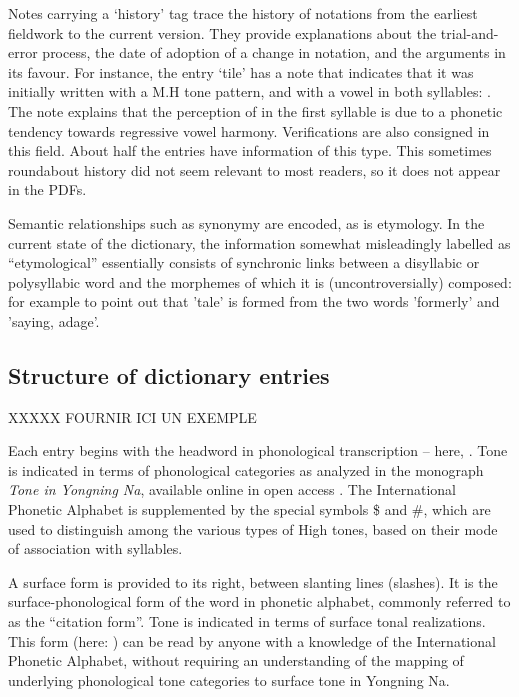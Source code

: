 Notes carrying a ‘history’ tag trace the history of notations from the earliest fieldwork to the current version. They provide explanations about the trial-and-error process, the date of adoption of a change in notation, and the arguments in its favour. For instance, the entry  ‘tile' has a note that indicates that it was initially written with a M.H tone pattern, and with a  vowel in both syllables: . The note explains that the perception of  in the first syllable is due to a phonetic tendency towards regressive vowel harmony. Verifications are also consigned in this field. About half the entries have information of this type. This sometimes roundabout history did not seem relevant to most readers, so it does not appear in the PDFs.

Semantic relationships such as synonymy are encoded, as is etymology. In the current state of the dictionary, the information somewhat misleadingly labelled as “etymological” essentially consists of synchronic links between a disyllabic or polysyllabic word and the morphemes of which it is (uncontroversially) composed: for example to point out that  'tale' is formed from the two words  'formerly' and  'saying, adage'.

\subsection{Structure of dictionary entries}
\label{sec:structure_of_entries}

XXXXX FOURNIR ICI UN EXEMPLE

Each entry begins with the headword in phonological transcription -- here, . Tone is indicated in terms of phonological categories as analyzed in the monograph \emph{Tone in Yongning Na}, available online in open access \parencite[80-90]{michaud2017}. The International Phonetic Alphabet is supplemented by the special symbols \$ and \#, which are used to distinguish among the various types of High tones, based on their mode of association with syllables.

A surface form is provided to its right, between slanting lines (slashes). It is the surface-phonological form of the word in phonetic alphabet, commonly referred to as the ``citation form''. Tone is indicated in terms of surface tonal realizations. This form (here: ) can be read by anyone with a knowledge of the International Phonetic Alphabet, without requiring an understanding of the mapping of underlying phonological tone categories to surface tone in Yongning Na.

